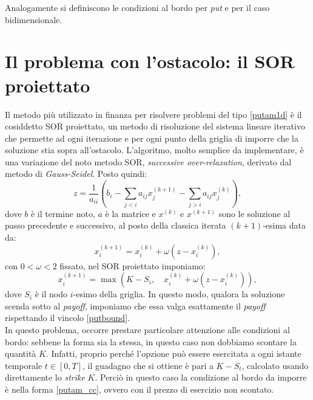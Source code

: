 \documentclass[a4paper,10pt]{report}
\theoremstyle{plain}
\theoremstyle{definition}
\theoremstyle{remark}
\begin{document}
Analogamente si definiscono le condizioni al bordo per \emph{put} e per il caso bidimensionale.

\section{Il problema con l'ostacolo: il SOR proiettato}
Il metodo pi\`u utilizzato in finanza per risolvere problemi del tipo \eqref{putam1d}  \`e il cosiddetto SOR proiettato, un metodo di risoluzione del sistema lineare iterativo che permette ad ogni iterazione e per ogni punto della griglia di imporre che la soluzione stia sopra all'ostacolo. L'algoritmo, molto semplice da implementare, \`e una variazione del noto metodo SOR, \emph{successive over-relaxation}, derivato dal metodo di \emph{Gauss-Seidel}. Posto quindi: $$z=\frac{1}{a_{ii}}\left(b_i-\sum_{j<i}a_{ij}x_j^{(k+1)}-\sum_{j>i}a_{ij}x_j^{(k)}\right),$$dove $b$ \`e il termine noto, $a$ \`e la matrice e $x^{(k)}$ e $x^{(k+1)}$ sono le soluzione al passo precedente e successivo, al posto della classica iterata $(k+1)$-esima data da: $$x_i^{(k+1)}=x_i^{(k)}+\omega(z-x_i^{(k)}),$$con $0<\omega<2$ fissato, nel SOR proiettato imponiamo: $$x_i^{(k+1)}=\max\left(K-S_i,\quad x_i^{(k)}+\omega(z-x_i^{(k)})\right),$$dove $S_i$ \`e il nodo $i$-esimo della griglia. In questo modo, qualora la soluzione scenda sotto al \emph{payoff}, imponiamo che essa valga esattamente il \emph{payoff} rispettando il vincolo \eqref{putbound}.\\
In questo problema, occorre prestare particolare attenzione alle condizioni al bordo: sebbene la forma sia la stessa, in questo caso non dobbiamo scontare la quantità $K$. Infatti, proprio perché l'opzione può essere esercitata a ogni istante temporale $t\in[0, T]$, il guadagno che si ottiene è pari a $K-S_t$, calcolato usando direttamente lo \emph{strike} $K$. Perci\`o in questo caso la condizione al bordo da imporre \`e nella forma \ref{putam_cc}, ovvero con il prezzo di esercizio non scontato.
\end{document}
